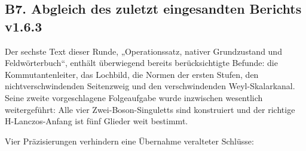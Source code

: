 \subsection{B7. Abgleich des zuletzt eingesandten Berichts
v1.6.3}\label{b7.-abgleich-des-zuletzt-eingesandten-berichts-v1.6.3}

Der sechste Text dieser Runde, „Operationssatz, nativer Grundzustand und
Feldwörterbuch``, enthält überwiegend bereits berücksichtigte Befunde:
die Kommutantenleiter, das Lochbild, die Normen der ersten Stufen, den
nichtverschwindenden Seitenzweig und den verschwindenden
Weyl-Skalarkanal. Seine zweite vorgeschlagene Folgeaufgabe wurde
inzwischen wesentlich weitergeführt: Alle vier Zwei-Boson-Singuletts
sind konstruiert und der richtige H-Lanczos-Anfang ist fünf Glieder weit
bestimmt.

Vier Präzisierungen verhindern eine Übernahme veralteter Schlüsse:

